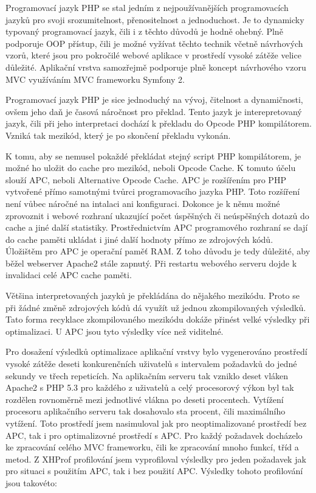 \documentclass[12pt]{article}
\begin{document}
Programovací jazyk PHP se stal jedním z nejpoužívanějších programovacích jazyků pro svoji srozumitelnost, přenositelnost a jednoduchost. Je to dynamicky typovaný programovací jazyk, čili i z těchto důvodů je hodně ohebný. Plně podporuje OOP přístup, čili je možné vyžívat těchto technik včetně návrhových vzorů, které jsou pro pokročilé webové aplikace v prostředí vysoké zátěže velice důležité. Aplikační vrstva samozřejmě podporuje plně koncept návrhového vzoru MVC využíváním MVC frameworku Symfony 2.


\label{sec:optim-apc}
Programovací jazyk PHP je sice jednoduchý na vývoj, čitelnost a dynamičnosti, ovšem jeho daň je časová náročnost pro překlad. Tento jazyk je interepretovaný jazyk, čili při jeho interpretaci dochází k překladu do Opcode PHP kompilátorem. Vzniká tak mezikód, který je po skončení překladu vykonán.

K tomu, aby se nemusel pokaždé překládat stejný script PHP kompilátorem, je možné ho uložit do cache pro mezikód, neboli Opcode Cache. K tomuto účelu slouží APC, neboli Alternative Opcode Cache. APC je rozšířením pro PHP vytvořené přímo samotnými tvůrci programovacího jazyka PHP. Toto rozšíření není vůbec náročné na intalaci ani konfiguraci. Dokonce je k němu možné zprovoznit i webové rozhraní ukazující počet úspěšných či neúspěšných dotazů do cache a jiné další statistiky. Prostřednictvím APC programového rozhraní se dají do cache paměti ukládat i jiné další hodnoty přímo ze zdrojových kódů. Úložištěm pro APC je operační paměť RAM. Z toho důvodu je tedy důležité, aby běžel webserver Apache2 stále zapnutý. Při restartu webového serveru dojde k invalidaci celé APC cache paměti.\cite{apc}

Většina interpretovaných jazyků je překládána do nějakého mezikódu. Proto se při žádné změně zdrojových kódů dá využít už jednou zkompilovaných výsledků. Tato forma recyklace zkompilovaného mezikódu dokáže přinést velké výsledky při optimalizaci. U APC jsou tyto výsledky více než viditelné.

Pro dosažení výsledků optimalizace aplikační vrstvy bylo vygenerováno prostředí vysoké zátěže deseti konkurenčních uživatelů s intervalem požadavků do jedné sekundy ve třech repeticích. Na aplikačním serveru tak vzniklo deset vláken Apache2 s PHP 5.3 pro každého z uživatelů a celý procesorový výkon byl tak rozdělen rovnoměrně mezi jednotlivé vlákna po deseti procentech. Vytížení procesoru aplikačního serveru tak dosahovalo sta procent, čili maximálního vytížení. Toto prostředí jsem nasimuloval jak pro neoptimalizované prostředí bez APC, tak i pro optimalizovné prostředí s APC. Pro každý požadavek docházelo ke zpracování celého MVC frameworku, čili ke zpracování mnoho funkcí, tříd a metod. Z XHProf profilování jsem vyprofiloval výsledky pro jeden požadavek jak pro situaci s použitím APC, tak i bez použití APC. Výsledky tohoto profilování jsou takovéto:
\end{document}
